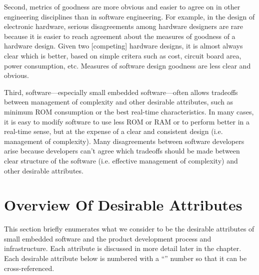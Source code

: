 Second, metrics of goodness are more obvious and easier to agree
on in other engineering disciplines than in software engineering.
For example, in the design of electronic hardware, serious disagreements 
among hardware
designers are rare because it is easier to reach agreement about the
measures of goodness of a hardware design.  Given two [competing] hardware
designs, it is almost always clear which is better, based on simple
critera such as cost, circuit board area, power consumption, etc.
Measures of software design goodness are less clear and obvious.

Third, software---especially small embedded software---often allows
tradeoffs between management of complexity and other desirable
attributes, such as minimum ROM consumption or the best real-time
characteristics.  In many cases, it is easy to modify software
to use less ROM or RAM or to perform better in a real-time sense,
but at the expense of a clear and consistent design (i.e. management of
complexity).
Many disagreements between software developers
arise because developers can't agree which tradeoffs should be
made between
clear structure of the software (i.e. effective management of complexity)
and other desirable attributes.


\section{Overview Of Desirable Attributes}
\label{chgr0:soda0}

This section briefly enumerates what we consider to be the desirable
attributes of small embedded software and the product development
process and infrastructure.  Each attribute is discussed in more
detail later in the chapter.  Each desirable attribute below is 
numbered with a ``\desirablepropertyprefix'' number so that it
can be cross-referenced.

